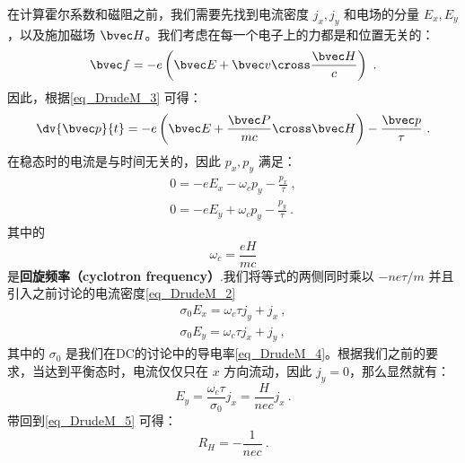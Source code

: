 在计算霍尔系数和磁阻之前，我们需要先找到电流密度 $j_x,j_y$ 和电场的分量 $E_x,E_y$，以及施加磁场 $\bvec H$。我们考虑在每一个电子上的力都是和位置无关的：
\begin{equation}
\bvec f = -e\left(\bvec E +\bvec v\cross \frac{\bvec H}{c}\right)~.
\end{equation}
因此，根据\autoref{eq_DrudeM_3} 可得：
\begin{equation}
\dv{\bvec p}{t}=-e\left(\bvec E +\frac{\bvec P}{mc}\cross \bvec H\right)-\frac{\bvec p}{\tau}~.
\end{equation}
在稳态时的电流是与时间无关的，因此 $p_x,p_y$ 满足：
\begin{align}
0=-eE_x-\omega_c p_y -\frac{p_x}{\tau}~,\\
0=-eE_y+\omega_c p_y -\frac{p_y}{\tau}~.
\end{align}
其中的
\begin{equation}
\omega_c = \frac{eH}{mc}
\end{equation}
是\textbf{回旋频率（cyclotron frequency）}.我们将等式的两侧同时乘以 $-ne\tau/m$ 并且引入之前讨论的电流密度\autoref{eq_DrudeM_2} 
\begin{align}
\sigma_0 E_x = \omega_c \tau j_y+j_x~,\\
\sigma_0 E_y = \omega_c \tau j_x+j_y~,
\end{align}
其中的 $\sigma_0$ 是我们在DC的讨论中的导电率\autoref{eq_DrudeM_4}。根据我们之前的要求，当达到平衡态时，电流仅仅只在 $x$ 方向流动，因此 $j_y = 0$，那么显然就有：
\begin{equation}
 E_y = \frac{\omega_c \tau }{\sigma_0}j_x=\frac{H}{nec}j_x~.
\end{equation}
带回到\autoref{eq_DrudeM_5} 可得：
\begin{equation}
R_H=-\frac{1}{nec}~.
\end{equation}

